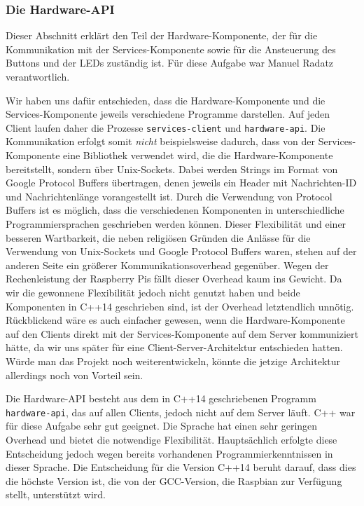 \subsubsection{Die Hardware-API}

Dieser Abschnitt erklärt den Teil der Hardware-Komponente, der für die Kommunikation mit der
Services-Komponente sowie für die Ansteuerung des Buttons und der LEDs zuständig ist.
Für diese Aufgabe war Manuel Radatz verantwortlich.

Wir haben uns dafür entschieden, dass die Hardware-Komponente und die Services-Komponente jeweils
verschiedene Programme darstellen.
Auf jeden Client laufen daher die Prozesse \texttt{services-client} und \texttt{hardware-api}.
Die Kommunikation erfolgt somit \textit{nicht} beispielsweise dadurch, dass von der
Services-Komponente eine Bibliothek verwendet wird, die die Hardware-Komponente bereitstellt,
sondern über Unix-Sockets.
Dabei werden Strings im Format von Google Protocol Buffers übertragen, denen jeweils ein Header mit
Nachrichten-ID und Nachrichtenlänge vorangestellt ist.
Durch die Verwendung von Protocol Buffers ist es möglich, dass die verschiedenen Komponenten in
unterschiedliche Programmiersprachen geschrieben werden können.
Dieser Flexibilität und einer besseren Wartbarkeit, die neben religiösen Gründen die Anlässe für
die Verwendung von Unix-Sockets und Google Protocol Buffers waren, stehen auf der anderen Seite ein
größerer Kommunikationsoverhead gegenüber.
Wegen der Rechenleistung der Raspberry Pis fällt dieser Overhead kaum ins Gewicht.
Da wir die gewonnene Flexibilität jedoch nicht genutzt haben und beide Komponenten in C++14
geschrieben sind, ist der Overhead letztendlich unnötig.
Rückblickend wäre es auch einfacher gewesen, wenn die Hardware-Komponente auf den Clients direkt
mit der Services-Komponente auf dem Server kommuniziert hätte, da wir uns später für eine
Client-Server-Architektur entschieden hatten.
Würde man das Projekt noch weiterentwickeln, könnte die jetzige Architektur allerdings noch von
Vorteil sein.

Die Hardware-API besteht aus dem in C++14 geschriebenen Programm \texttt{hardware-api}, das auf
allen Clients, jedoch nicht auf dem Server läuft.
C++ war für diese Aufgabe sehr gut geeignet.
Die Sprache hat einen sehr geringen Overhead und bietet die notwendige Flexibilität.
Hauptsächlich erfolgte diese Entscheidung jedoch wegen bereits vorhandenen Programmierkenntnissen
in dieser Sprache.
Die Entscheidung für die Version C++14 beruht darauf, dass dies die höchste Version ist, die von der
GCC-Version, die Raspbian zur Verfügung stellt, unterstützt wird.

